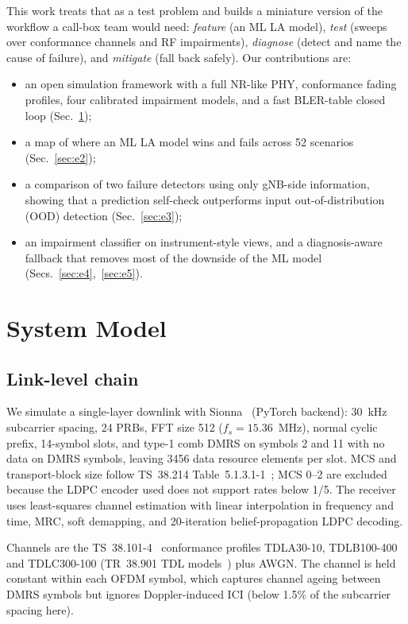 \documentclass[conference]{IEEEtran}
\begin{document}
This work treats that as a test problem and builds a miniature version of the workflow a
call-box team would need: \emph{feature} (an ML LA model), \emph{test} (sweeps over
conformance channels and RF impairments), \emph{diagnose} (detect and name the cause of
failure), and \emph{mitigate} (fall back safely). Our contributions are:
\begin{itemize}
\item an open simulation framework with a full NR-like PHY, conformance fading profiles,
four calibrated impairment models, and a fast BLER-table closed loop (Sec.~\ref{sec:sys});
\item a map of where an ML LA model wins and fails across 52 scenarios (Sec.~\ref{sec:e2});
\item a comparison of two failure detectors using only gNB-side information, showing that a
prediction self-check outperforms input out-of-distribution (OOD) detection
(Sec.~\ref{sec:e3});
\item an impairment classifier on instrument-style views, and a diagnosis-aware fallback that
removes most of the downside of the ML model (Secs.~\ref{sec:e4},~\ref{sec:e5}).
\end{itemize}

\section{System Model}\label{sec:sys}

\subsection{Link-level chain}
We simulate a single-layer downlink with Sionna~\cite{sionna} (PyTorch backend): 30~kHz
subcarrier spacing, 24 PRBs, FFT size 512 ($f_s=15.36$~MHz), normal cyclic prefix, 14-symbol
slots, and type-1 comb DMRS on symbols 2 and 11 with no data on DMRS symbols, leaving 3456
data resource elements per slot. MCS and transport-block size follow TS~38.214
Table~5.1.3.1-1~\cite{ts38214}; MCS 0--2 are excluded because the LDPC encoder used does not
support rates below 1/5. The receiver uses least-squares channel estimation with linear
interpolation in frequency and time, MRC, soft demapping, and 20-iteration belief-propagation
LDPC decoding.

Channels are the TS~38.101-4~\cite{ts38101_4} conformance profiles TDLA30-10, TDLB100-400 and
TDLC300-100 (TR~38.901 TDL models~\cite{tr38901}) plus AWGN. The channel is held constant
within each OFDM symbol, which captures channel ageing between DMRS symbols but ignores
Doppler-induced ICI (below 1.5\% of the subcarrier spacing here).
\end{document}
